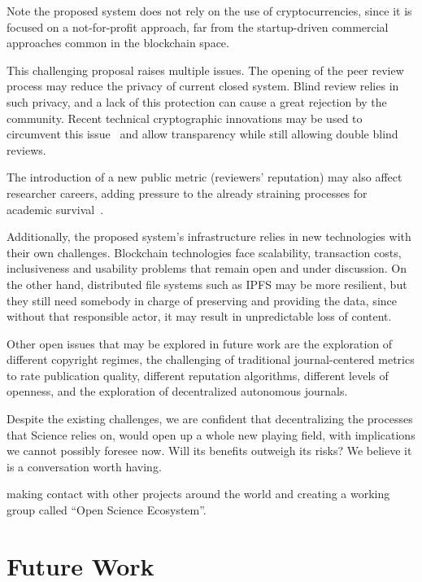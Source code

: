 Note the proposed system does not rely on the use of cryptocurrencies, since it
is focused on a not-for-profit approach, far from the startup-driven commercial
approaches common in the blockchain space.

This challenging proposal raises multiple issues. The opening of the peer review
process may reduce the privacy of current closed system. Blind review relies in
such privacy, and a lack of this protection can cause a great rejection by the
community. Recent technical cryptographic innovations may be used to circumvent
this issue~\cite{blum1988non} and allow transparency while still allowing double
blind reviews.

The introduction of a new public metric (reviewers' reputation) may also affect
researcher careers, adding pressure to the already straining processes for
academic survival~\cite{de2005publish}.

Additionally, the proposed system's infrastructure relies in new technologies
with their own challenges. Blockchain technologies face scalability, transaction
costs, inclusiveness and usability problems that remain open and under
discussion. On the other hand, distributed file systems such as IPFS may be more
resilient, but they still need somebody in charge of preserving and providing
the data, since without that responsible actor, it may result in unpredictable
loss of content.

Other open issues that may be explored in future work are the exploration of
different copyright regimes, the challenging of traditional journal-centered
metrics to rate publication quality, different reputation algorithms, different
levels of openness, and the exploration of decentralized autonomous journals.

Despite the existing challenges, we are confident that decentralizing the
processes that Science relies on, would open up a whole new playing field, with
implications we cannot possibly foresee now. Will its benefits outweigh its
risks? We believe it is a conversation worth having.


making contact with other projects around the world and creating a working group
called ``Open Science Ecosystem''.

\section{Future Work}

